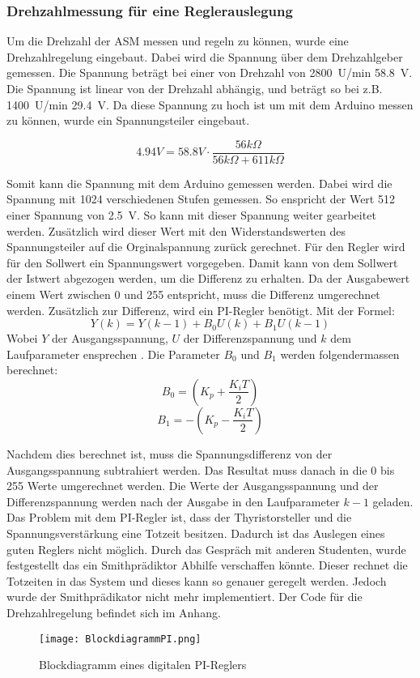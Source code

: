 \subsubsection{Drehzahlmessung für eine Reglerauslegung}
Um die Drehzahl der ASM messen und regeln zu können, wurde eine Drehzahlregelung eingebaut. Dabei wird die Spannung über dem Drehzahlgeber gemessen. Die Spannung beträgt bei einer von Drehzahl von \SI{2800}{U/min} \SI{58.8}{V}. Die Spannung ist linear von der Drehzahl abhängig, und beträgt so bei z.B. \SI{1400}{U/min} \SI{29.4}{V}. Da diese Spannung zu hoch ist um mit dem Arduino messen zu können, wurde ein Spannungsteiler eingebaut. 

\begin{equation}
4.94 V = 58.8 V \cdot \frac{56k\Omega}{56k\Omega + 611k\Omega}
\end{equation}

Somit kann die Spannung mit dem Arduino gemessen werden. Dabei wird die Spannung mit 1024 verschiedenen Stufen gemessen. So enspricht der Wert 512 einer Spannung von \SI{2.5}{V}.
 So kann mit dieser Spannung weiter gearbeitet werden. Zusätzlich wird dieser Wert mit den Widerstandswerten des Spannungsteiler auf die Orginalspannung zurück gerechnet. Für den Regler wird für den Sollwert ein Spannungswert vorgegeben. Damit kann von dem Sollwert der Istwert abgezogen werden, um die Differenz zu erhalten. Da der Ausgabewert einem Wert zwischen 0 und 255 entspricht, muss die Differenz umgerechnet werden. Zusätzlich zur Differenz, wird ein PI-Regler benötigt. 
Mit der Formel: \cite{Quelle_Marco} 
\begin{equation}
Y(k) = Y(k-1)+ B_0U(k)+B_1U(k-1)
\end{equation}
Wobei $Y$ der Ausgangsspannung, $U$ der Differenzspannung und $k$ dem Laufparameter ensprechen \cite{PI_Regler}. Die Parameter $B_0$ und $B_1$ werden folgendermassen berechnet:
\begin{equation}\label{eq:B0}
B_0 = \left(K_p + \frac{K_iT}{2}\right) 
\end{equation}
\begin{equation}\label{eq:B1}
B_1 = -\left(K_p - \frac{K_iT}{2}\right) 
\end{equation}

Nachdem dies berechnet ist, muss die Spannungsdifferenz von der Ausgangsspannung subtrahiert werden. Das Resultat muss danach in die 0 bis 255 Werte umgerechnet werden. Die Werte der Ausgangsspannung und der Differenzspannung werden nach der Ausgabe in den Laufparameter $k-1$ geladen. Das Problem mit dem PI-Regler ist, dass der Thyristorsteller und die Spannungsverstärkung eine Totzeit besitzen. Dadurch ist das Auslegen eines guten Reglers nicht möglich. Durch das Gespräch mit anderen Studenten, wurde festgestellt das ein Smithprädiktor \cite{Regelungstechnik_Buch} Abhilfe verschaffen könnte. Dieser rechnet die Totzeiten in das System und dieses kann so genauer geregelt werden. Jedoch wurde der Smithprädikator nicht mehr implementiert. Der Code für die Drehzahlregelung befindet sich im Anhang. 

\begin{figure}[ht!]
	\centering
	\texttt{[image: BlockdiagrammPI.png]}	
	\caption{Blockdiagramm eines digitalen PI-Reglers}\label{fig:PIRegler}\cite{PI_Regler}
\end{figure}







